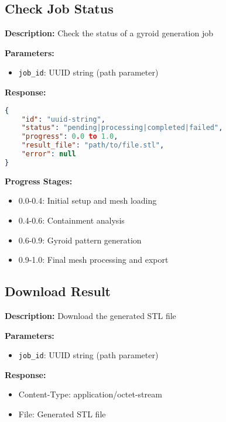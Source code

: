 \subsection{Check Job Status}
\begin{tcolorbox}[title=GET /job/\{job\_id\}]
\textbf{Description:} Check the status of a gyroid generation job

\textbf{Parameters:}
\begin{itemize}
    \item \texttt{job\_id}: UUID string (path parameter)
\end{itemize}

\textbf{Response:}
\begin{lstlisting}[language=json]
{
    "id": "uuid-string",
    "status": "pending|processing|completed|failed",
    "progress": 0.0 to 1.0,
    "result_file": "path/to/file.stl",
    "error": null
}
\end{lstlisting}

\textbf{Progress Stages:}
\begin{itemize}
    \item 0.0-0.4: Initial setup and mesh loading
    \item 0.4-0.6: Containment analysis
    \item 0.6-0.9: Gyroid pattern generation
    \item 0.9-1.0: Final mesh processing and export
\end{itemize}
\end{tcolorbox}

\subsection{Download Result}
\begin{tcolorbox}[title=GET /job/\{job\_id\}/result]
\textbf{Description:} Download the generated STL file

\textbf{Parameters:}
\begin{itemize}
    \item \texttt{job\_id}: UUID string (path parameter)
\end{itemize}

\textbf{Response:}
\begin{itemize}
    \item Content-Type: application/octet-stream
    \item File: Generated STL file
\end{itemize}
\end{tcolorbox}

